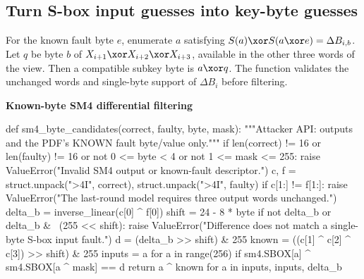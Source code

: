 \subsection{Turn S-box input guesses into key-byte guesses}
For the known fault byte $e$, enumerate $a$ satisfying $S(a)\xor S(a\xor e)=\Delta B_{i,b}$. Let $q$ be byte $b$ of $X_{i+1}\xor X_{i+2}\xor X_{i+3}$, available in the other three words of the view. Then a compatible subkey byte is $a\xor q$. The function validates the unchanged words and single-byte support of $\Delta B_i$ before filtering.
\par\smallskip\noindent\textbf{Known-byte SM4 differential filtering}\par
\begin{lightcode}
def sm4_byte_candidates(correct, faulty, byte, mask):
    """Attacker API: outputs and the PDF's KNOWN fault byte/value only."""
    if len(correct) != 16 or len(faulty) != 16 or not 0 <= byte < 4 or not 1 <= mask <= 255:
        raise ValueError("Invalid SM4 output or known-fault descriptor.")
    c, f = struct.unpack(">4I", correct), struct.unpack(">4I", faulty)
    if c[1:] != f[1:]:
        raise ValueError("The last-round model requires three output words unchanged.")
    delta_b = inverse_linear(c[0] ^ f[0])
    shift = 24 - 8 * byte
    if not delta_b or delta_b & ~(255 << shift):
        raise ValueError("Difference does not match a single-byte S-box input fault.")
    d = (delta_b >> shift) & 255
    known = ((c[1] ^ c[2] ^ c[3]) >> shift) & 255
    inputs = {a for a in range(256) if sm4.SBOX[a] ^ sm4.SBOX[a ^ mask] == d}
    return {a ^ known for a in inputs}, inputs, delta_b
\end{lightcode}

